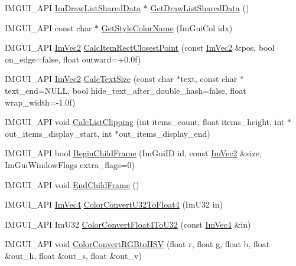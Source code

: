 \begin{DoxyCompactItemize}
\item 
I\+M\+G\+U\+I\+\_\+\+A\+PI \hyperlink{struct_im_draw_list_shared_data}{Im\+Draw\+List\+Shared\+Data} $\ast$ \hyperlink{namespace_im_gui_a2a5a77bd5b6215e8cb47a8a457224a52}{Get\+Draw\+List\+Shared\+Data} ()
\item 
I\+M\+G\+U\+I\+\_\+\+A\+PI const char $\ast$ \hyperlink{namespace_im_gui_a265d7614c4c0b92ba6dd43946a3293e0}{Get\+Style\+Color\+Name} (Im\+Gui\+Col idx)
\item 
I\+M\+G\+U\+I\+\_\+\+A\+PI \hyperlink{struct_im_vec2}{Im\+Vec2} \hyperlink{namespace_im_gui_a6c66a7acf7e6eef639b5f1211d8332a3}{Calc\+Item\+Rect\+Closest\+Point} (const \hyperlink{struct_im_vec2}{Im\+Vec2} \&pos, bool on\+\_\+edge=false, float outward=+0.\+0f)
\item 
I\+M\+G\+U\+I\+\_\+\+A\+PI \hyperlink{struct_im_vec2}{Im\+Vec2} \hyperlink{namespace_im_gui_a848b9db6cc4a186751c0ecebcaadc33b}{Calc\+Text\+Size} (const char $\ast$text, const char $\ast$text\+\_\+end=N\+U\+LL, bool hide\+\_\+text\+\_\+after\+\_\+double\+\_\+hash=false, float wrap\+\_\+width=-\/1.\+0f)
\item 
I\+M\+G\+U\+I\+\_\+\+A\+PI void \hyperlink{namespace_im_gui_ae5319370628374ef8febf0c25c285b7e}{Calc\+List\+Clipping} (int items\+\_\+count, float items\+\_\+height, int $\ast$out\+\_\+items\+\_\+display\+\_\+start, int $\ast$out\+\_\+items\+\_\+display\+\_\+end)
\item 
I\+M\+G\+U\+I\+\_\+\+A\+PI bool \hyperlink{namespace_im_gui_a26d6981a769d3fbe9be9a25975b5dc6b}{Begin\+Child\+Frame} (Im\+Gui\+ID id, const \hyperlink{struct_im_vec2}{Im\+Vec2} \&size, Im\+Gui\+Window\+Flags extra\+\_\+flags=0)
\item 
I\+M\+G\+U\+I\+\_\+\+A\+PI void \hyperlink{namespace_im_gui_ac4bd9024554b5074805bc0ce3076c514}{End\+Child\+Frame} ()
\item 
I\+M\+G\+U\+I\+\_\+\+A\+PI \hyperlink{struct_im_vec4}{Im\+Vec4} \hyperlink{namespace_im_gui_a74df648cad381b5ad979c3609b7f4b2a}{Color\+Convert\+U32\+To\+Float4} (Im\+U32 in)
\item 
I\+M\+G\+U\+I\+\_\+\+A\+PI Im\+U32 \hyperlink{namespace_im_gui_abe2691de0b1a71c774ab24cc91564a94}{Color\+Convert\+Float4\+To\+U32} (const \hyperlink{struct_im_vec4}{Im\+Vec4} \&in)
\item 
I\+M\+G\+U\+I\+\_\+\+A\+PI void \hyperlink{namespace_im_gui_aaed5ed34aaaa02b61cbb67598c0ad9ca}{Color\+Convert\+R\+G\+Bto\+H\+SV} (float r, float g, float b, float \&out\+\_\+h, float \&out\+\_\+s, float \&out\+\_\+v)
\item 

\end{DoxyCompactItemize}
